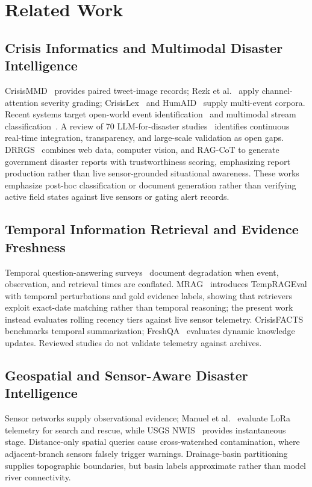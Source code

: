 \documentclass[conference]{IEEEtran}
\begin{document}
\section{Related Work}
\subsection{Crisis Informatics and Multimodal Disaster Intelligence}
CrisisMMD~\cite{crisismmd} provides paired tweet-image records; Rezk et al.~\cite{rezk2023} apply channel-attention severity grading; CrisisLex~\cite{olteanu2014} and HumAID~\cite{humaid} supply multi-event corpora. Recent systems target open-world event identification~\cite{yu2025} and multimodal stream classification~\cite{kim2025}. A review of 70 LLM-for-disaster studies~\cite{xu2025} identifies continuous real-time integration, transparency, and large-scale validation as open gaps. DRRGS~\cite{drrgs2026} combines web data, computer vision, and RAG-CoT to generate government disaster reports with trustworthiness scoring, emphasizing report production rather than live sensor-grounded situational awareness. These works emphasize post-hoc classification or document generation rather than verifying active field states against live sensors or gating alert records.

\subsection{Temporal Information Retrieval and Evidence Freshness}
Temporal question-answering surveys~\cite{piryani2023} document degradation when event, observation, and retrieval times are conflated. MRAG~\cite{mrag2025} introduces TempRAGEval with temporal perturbations and gold evidence labels, showing that retrievers exploit exact-date matching rather than temporal reasoning; the present work instead evaluates rolling recency tiers against live sensor telemetry. CrisisFACTS~\cite{crisisfacts} benchmarks temporal summarization; FreshQA~\cite{freshqa} evaluates dynamic knowledge updates. Reviewed studies do not validate telemetry against archives.

\subsection{Geospatial and Sensor-Aware Disaster Intelligence}
Sensor networks supply observational evidence; Manuel et al.~\cite{manuel2024} evaluate LoRa telemetry for search and rescue, while USGS NWIS~\cite{usgsnwis} provides instantaneous stage. Distance-only spatial queries cause cross-watershed contamination, where adjacent-branch sensors falsely trigger warnings. Drainage-basin partitioning supplies topographic boundaries, but basin labels approximate rather than model river connectivity.
\end{document}
